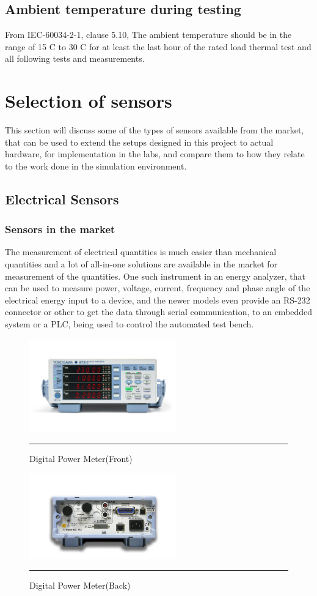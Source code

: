 \subsection{Ambient temperature during testing}
From IEC-60034-2-1, clause 5.10, The ambient temperature should be in the range of 15 \degree C to 30 \degree C for at least the last hour of the rated load thermal test and all following tests and measurements.

\section{Selection of sensors}
This section will discuss some of the types of sensors available from the market, that can be used to extend the setups designed in this project to actual hardware, for implementation in the labs, and compare them to how they relate to the work done in the simulation environment.
\subsection{Electrical Sensors}
\subsubsection{Sensors in the market}
The measurement of electrical quantities is much easier than mechanical quantities and a lot of all-in-one solutions are available in the market for measurement of the quantities. One such instrument in an energy analyzer, that can be used to measure power, voltage, current, frequency and phase angle of the electrical energy input to a device, and the newer models even provide an RS-232 connector or other to get the data through serial communication, to an embedded system or a PLC, being used to control the automated test bench.

\begin{figure}[htbp]
	\centering
		\includegraphics[width = 2.5in]{./Figures/MS/fig311.png}
		\rule{35em}{0.5pt}
	\caption{Digital Power Meter(Front)}
	\label{fig:Digital Power Meter(Front)} 
\end{figure}
\begin{figure}[htbp]
	\centering
		\includegraphics[width = 2.5in]{./Figures/MS/fig312.png}
		\rule{35em}{0.5pt}
	\caption{Digital Power Meter(Back)}
	\label{fig:Digital Power Meter(Back)} 
\end{figure}

